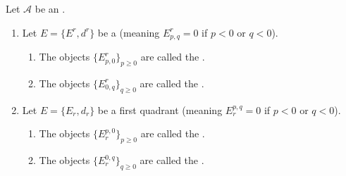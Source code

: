 \begin{definition} \label{definition:base_fiber_terms_of_first_quadrant_spectral_sequence_in_an_abelian_category}
Let $\mathcal{A}$ be an . 

\begin{enumerate}
    \item Let $E = \{E^r, d^r\}$ be a   (meaning $E^r_{p,q} = 0$ if $p < 0$ or $q < 0$).
    \begin{enumerate}
        \item The objects $\{E^r_{p,0}\}_{p \ge 0}$ are called the .
        \item The objects $\{E^r_{0,q}\}_{q \ge 0}$ are called the .
    \end{enumerate}

    \item Let $E = \{E_r, d_r\}$ be a first quadrant  (meaning $E_r^{p,q} = 0$ if $p < 0$ or $q < 0$).
    \begin{enumerate}
        \item The objects $\{E_r^{p,0}\}_{p \ge 0}$ are called the .
        \item The objects $\{E_r^{0,q}\}_{q \ge 0}$ are called the .
    \end{enumerate}
\end{enumerate}
\end{definition}